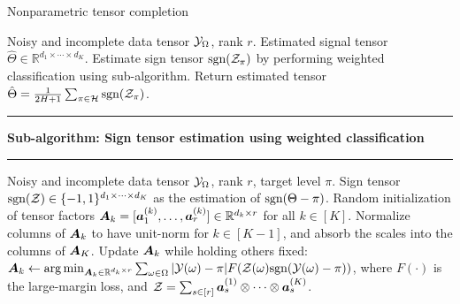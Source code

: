 \documentclass[10pt]{article}
\def\sign{\textup{sgn}}
\newcommand\Algphase[1]{%
\vspace*{-.7\baselineskip}\Statex\hspace*{\dimexpr-\algorithmicindent-2pt\relax}\rule{\textwidth}{0.4pt}%
\Statex\hspace*{-\algorithmicindent}\textbf{#1}%
\vspace*{-.7\baselineskip}\Statex\hspace*{\dimexpr-\algorithmicindent-2pt\relax}\rule{\textwidth}{0.4pt}%
}
\begin{document}
\begin{algorithm}
  \caption{Nonparametric tensor completion}\label{alg:tensorT}
 \begin{algorithmic}[1] 
\INPUT  Noisy and incomplete data tensor $\mathcal{Y}_\Omega$, rank $r$.
\OUTPUT Estimated signal tensor $\hat \Theta\in\mathbb{R}^{d_1\times \cdots \times d_K}$.
\State Estimate sign tensor $\sign(\tZ_\pi)$ by performing weighted classification using sub-algorithm.
\EndFor
\State Return estimated tensor $\hat \Theta={1\over 2H+1}\sum_{\pi \in \tH}\sign(\tZ_\pi)$.
\vspace{.1cm}
\Algphase{Sub-algorithm: Sign tensor estimation using weighted classification}
\INPUT  Noisy and incomplete data tensor $\mathcal{Y}_\Omega$, rank $r$, target level $\pi$.
\OUTPUT Sign tensor $\sign(\tZ) \in\{-1,1\}^{d_1\times \cdots \times d_K}$ as the estimation of $\sign(\Theta-\pi)$. 
\State Random initialization of tensor factors $\bm A_k=[\bm{a}^{(k)}_1,\ldots,\bm{a}^{(k)}_r]\in\mathbb{R}^{d_k\times r}$ for all $k\in[K]$. 
\State Normalize columns of $\bm A_k$ to have unit-norm for $k\in[K-1]$, and absorb the scales into the columns of $\bm A_K$. 
\State Update $\bm A_k$ while holding others fixed: $\mA_k\leftarrow \argmin_{\mA_k\in\mathbb{R}^{d_k\times r}}\sum_{\omega\in \Omega} |\tY(\omega)-\pi|F(\tZ(\omega)\sign(\tY(\omega)-\pi))$, where $F(\cdot)$ is the large-margin loss, and $\mathcal{Z}=\sum_{s\in[r]} \bm{a}^{(1)}_s\otimes \cdots\otimes \bm{a}^{(K)}_s$. 
\EndFor
\EndWhile
    \end{algorithmic}
\end{algorithm}
\end{document}
